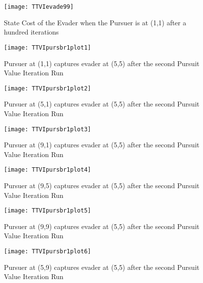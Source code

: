 \begin{figure}
\vspace{2.4in}
\centering
\texttt{[image: TTVIevade99]}
\caption{State Cost of the Evader when the Pursuer is at (1,1) after a hundred iterations}
\label{TTVIevade99}
\end{figure}
\clearpage
\newpage

\begin{figure}
\vspace{2.4in}
\centering
\texttt{[image: TTVIpursbr1plot1]}
\caption{Pursuer at (1,1) captures evader at (5,5) after the second Pursuit Value Iteration Run}
\label{TTVIpursbr1plot1}
\end{figure}
\clearpage
\newpage

\begin{figure}
\vspace{2.4in}
\centering
\texttt{[image: TTVIpursbr1plot2]}
\caption{Pursuer at (5,1) captures evader at (5,5) after the second Pursuit Value Iteration Run}
\label{TTVIpursbr1plot2}
\end{figure}
\clearpage
\newpage

\begin{figure}
\vspace{2.4in}
\centering
\texttt{[image: TTVIpursbr1plot3]}
\caption{Pursuer at (9,1) captures evader at (5,5) after the second Pursuit Value Iteration Run}
\label{TTVIpursbr1plot3}
\end{figure}
\clearpage
\newpage

\begin{figure}
\vspace{2.4in}
\centering
\texttt{[image: TTVIpursbr1plot4]}
\caption{Pursuer at (9,5) captures evader at (5,5) after the second Pursuit Value Iteration Run}
\label{TTVIpursbr1plot4}
\end{figure}
\clearpage
\newpage

\begin{figure}
\vspace{2.4in}
\centering
\texttt{[image: TTVIpursbr1plot5]}
\caption{Pursuer at (9,9) captures evader at (5,5) after the second Pursuit Value Iteration Run}
\label{TTVIpursbr1plot5}
\end{figure}
\clearpage
\newpage

\begin{figure}
\vspace{2.4in}
\centering
\texttt{[image: TTVIpursbr1plot6]}
\caption{Pursuer at (5,9) captures evader at (5,5) after the second Pursuit Value Iteration Run}
\label{TTVIpursbr1plot6}
\end{figure}
\clearpage
\newpage

